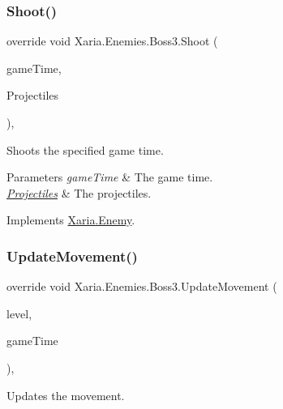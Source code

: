 \subsubsection{\texorpdfstring{Shoot()}{Shoot()}}
{\footnotesize\ttfamily override void Xaria.\+Enemies.\+Boss3.\+Shoot (\begin{DoxyParamCaption}\item[{Game\+Time}]{game\+Time,  }\item[{ref List$<$ \hyperlink{classXaria_1_1Projectile}{Projectile} $>$}]{Projectiles }\end{DoxyParamCaption})\hspace{0.3cm}{\ttfamily [inline]}, {\ttfamily [virtual]}}



Shoots the specified game time. 


\begin{DoxyParams}{Parameters}
{\em game\+Time} & The game time.\\
\hline
{\em \hyperlink{namespaceXaria_1_1Projectiles}{Projectiles}} & The projectiles.\\
\hline
\end{DoxyParams}


Implements \hyperlink{classXaria_1_1Enemy_a229b595e96e1429a9e9b1d9816d4370b}{Xaria.\+Enemy}.

\mbox{\label{classXaria_1_1Enemies_1_1Boss3_a60ae20b9df383474b5a59b0339773612}} 
\subsubsection{\texorpdfstring{Update\+Movement()}{UpdateMovement()}}
{\footnotesize\ttfamily override void Xaria.\+Enemies.\+Boss3.\+Update\+Movement (\begin{DoxyParamCaption}\item[{\hyperlink{classXaria_1_1Level}{Level}}]{level,  }\item[{Game\+Time}]{game\+Time }\end{DoxyParamCaption})\hspace{0.3cm}{\ttfamily [inline]}, {\ttfamily [virtual]}}



Updates the movement. 


